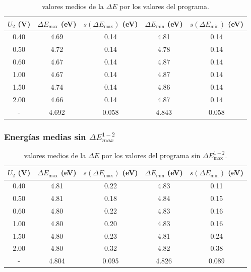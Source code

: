 \documentclass[12pt,a4paper]{article}
\numberwithin{equation}{section}
\numberwithin{figure}{section}
\begin{document}
\begin{table}[h!] \centering 
\begin{tabular}{ccccc} 
\hline $U_2$ (V) & $ \Delta E_{\max} $ (eV) & $s(\Delta E_{\max})$ (eV) & $ \Delta E_{\min} $ (eV) & $s(\Delta E_{\min})$ (eV) \\ \hline 
0.40 & 4.69 & 0.14 & 4.81 & 0.14 \\ 
0.50 & 4.72 & 0.14 & 4.78 & 0.14 \\ 
0.60 & 4.67 & 0.14 & 4.87 & 0.14 \\ 
1.00 & 4.67 & 0.14 & 4.87 & 0.14 \\ 
1.50 & 4.74 & 0.14 & 4.86 & 0.14 \\ 
2.00 & 4.66 & 0.14 & 4.87 & 0.14 \\ 
\hline  \hline 
- & 4.692 & 0.058 & 4.843 & 0.058 \\ 
\hline
\end{tabular}\caption{valores medios de la $\Delta E$ por los valores del programa.} 
\label{Tab:Em-2-lab} 
\end{table} 

 \newpage


\subsubsection{Energías medias sin $\Delta E_{max}^{1-2}$}

\begin{table}[h!] \centering 
\begin{tabular}{ccccc} 
\hline $U_2$ (V) & $ \Delta E_{\max} $ (eV) & $s(\Delta E_{\max})$ (eV) & $ \Delta E_{\min} $ (eV) & $s(\Delta E_{\min})$ (eV) \\ \hline 
0.40 & 4.81 & 0.22 & 4.83 & 0.11 \\ 
0.50 & 4.81 & 0.18 & 4.84 & 0.15 \\ 
0.60 & 4.80 & 0.22 & 4.83 & 0.16 \\ 
1.00 & 4.80 & 0.20 & 4.83 & 0.16 \\ 
1.50 & 4.80 & 0.23 & 4.81 & 0.24 \\ 
2.00 & 4.80 & 0.32 & 4.82 & 0.38 \\ 
\hline  \hline 
- & 4.804 & 0.095 & 4.826 & 0.089 \\ 
\hline
\end{tabular}
\caption{valores medios de la $\Delta E$ por los valores del programa sin $\Delta E_{\max}^{1-2}$.}
\label{Tab:Em-1-sin-par} 
\end{table} 
\end{document}
